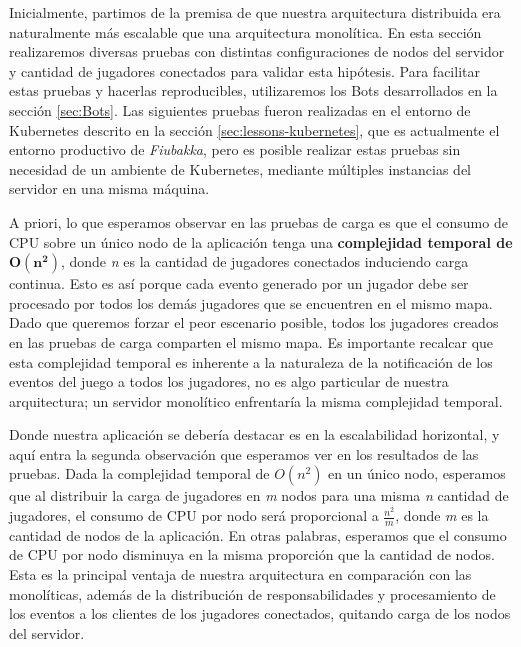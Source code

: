 
\noindent Inicialmente, partimos de la premisa de que nuestra arquitectura distribuida era naturalmente más escalable
que una arquitectura monolítica. En esta sección realizaremos diversas pruebas con distintas configuraciones de nodos del servidor y cantidad
de jugadores conectados para validar esta hipótesis. Para facilitar estas pruebas y hacerlas reproducibles, utilizaremos los Bots desarrollados
en la sección \ref{sec:Bots}. Las siguientes pruebas fueron realizadas en el entorno de Kubernetes descrito en la sección \ref{sec:lessons-kubernetes}, que es actualmente el entorno
productivo de \textit{Fiubakka}, pero es posible realizar estas pruebas sin necesidad de un ambiente de Kubernetes, mediante múltiples instancias del
servidor en una misma máquina.

A priori, lo que esperamos observar en las pruebas de carga es que el consumo de CPU sobre un único nodo de la aplicación tenga una \textbf{complejidad temporal
de $\boldsymbol{O(n^2)}$}, donde \textit{n} es la cantidad de jugadores conectados induciendo carga continua. Esto es así porque cada evento generado por un jugador debe ser procesado por todos los
demás jugadores que se encuentren en el mismo mapa. Dado que queremos forzar el peor escenario posible, todos los jugadores creados en las pruebas de carga comparten el mismo mapa.
Es importante recalcar que esta complejidad temporal es inherente a la naturaleza de la notificación de los eventos del juego a todos los jugadores, no es algo particular de nuestra arquitectura; un servidor monolítico
enfrentaría la misma complejidad temporal.

Donde nuestra aplicación se debería destacar es en la escalabilidad horizontal, y aquí entra la segunda observación que esperamos ver en los resultados de las pruebas. Dada la complejidad temporal de
$O(n^2)$ en un único nodo, esperamos que al distribuir la carga de jugadores en \textit{m} nodos para una misma \textit{n} cantidad de jugadores, el consumo de CPU por nodo será proporcional a \textbf{$\frac{n^2}{m}$}, donde \textit{m} es la cantidad de nodos
de la aplicación. En otras palabras, esperamos que el consumo de CPU por nodo disminuya en la misma proporción que la cantidad de nodos. Esta es la principal ventaja de nuestra arquitectura en comparación con las monolíticas,
además de la distribución de responsabilidades y procesamiento de los eventos a los clientes de los jugadores conectados, quitando carga de los nodos del servidor.

